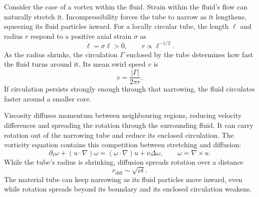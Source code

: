 Consider the case of a vortex within the fluid. Strain within the fluid's
flow can naturally stretch it. Incompressibility forces the tube to narrow
as it lengthens, squeezing its fluid particles inward. For a locally circular
tube, the length \(\ell\) and radius \(r\) respond to a positive axial
strain \(\sigma\) as
\[
 \dot\ell=\sigma\ell>0,
 \qquad r\propto\ell^{-1/2}.
\]
As the radius shrinks, the circulation \(\Gamma\) enclosed by the tube
determines how fast the fluid turns around it. Its mean swirl speed \(v\) is
\[
 v=\frac{|\Gamma|}{2\pi r}.
\]
If circulation persists strongly enough through that narrowing, the fluid
circulates faster around a smaller core.

Viscosity diffuses momentum between neighbouring regions, reducing velocity
differences and spreading the rotation through the surrounding fluid.
It can carry rotation out of the narrowing tube and reduce its enclosed
circulation. The vorticity equation contains this competition between
stretching and diffusion:
\[
 \partial_t\omega+(u\cdot\nabla)\omega
 =(\omega\cdot\nabla)u+\nu\Delta\omega,
 \qquad \omega=\nabla\times u.
\]
While the tube's radius is shrinking, diffusion spreads rotation over
a distance
\[
 r_{\mathrm{diff}}\sim\sqrt{\nu t}.
\]
The material tube can keep narrowing as its fluid particles move inward,
even while rotation spreads beyond its boundary and its enclosed
circulation weakens.
